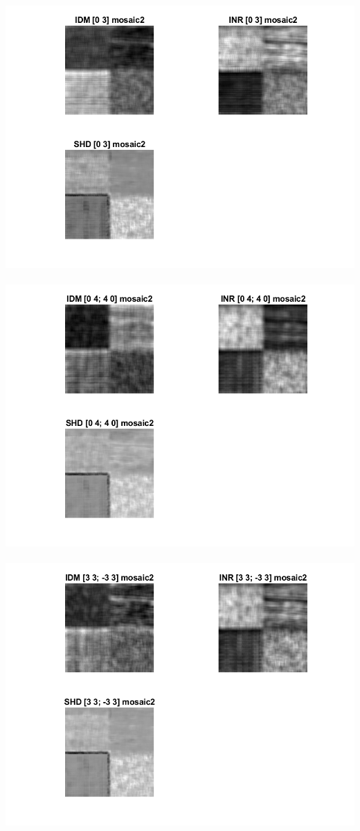 \documentclass[12pt, letterpaper, twoside]{article}
\begin{document}
\includegraphics[scale=1]{"m2[03].png"}\\
\ \\
\includegraphics[scale=1]{"m2[04;40].png"}\\
\ \\
\includegraphics[scale=1]{"m2[33;-33].png"}\\
\end{document}
